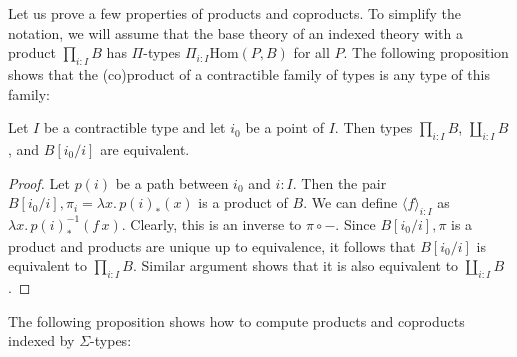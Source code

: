 \documentclass[reqno]{mscs}
\newcommand{\fs}[1]{\mathrm{#1}}
\newcommand{\Hom}{\fs{Hom}}
\newcommand{\sym}[1]{#1^{-1}}
\numberwithin{figure}{section}
\begin{document}
Let us prove a few properties of products and coproducts.
To simplify the notation, we will assume that the base theory of an indexed theory with a product $\prod_{i : I} B$ has $\Pi$-types $\Pi_{i : I} \Hom(P,B)$ for all $P$.
The following proposition shows that the (co)product of a contractible family of types is any type of this family:

\begin{prop}
Let $I$ be a contractible type and let $i_0$ be a point of $I$.
Then types $\prod_{i : I} B$, $\coprod_{i : I} B$, and $B[i_0/i]$ are equivalent.
\end{prop}
\begin{proof}
Let $p(i)$ be a path between $i_0$ and $i : I$.
Then the pair $B[i_0/i], \pi_i = \lambda x.\,p(i)_*(x)$ is a product of $B$.
We can define $\langle f \rangle_{i : I}$ as $\lambda x.\,\sym{p(i)}_*(f\,x)$.
Clearly, this is an inverse to $\pi \circ -$.
Since $B[i_0/i],\pi$ is a product and products are unique up to equivalence, it follows that $B[i_0/i]$ is equivalent to $\prod_{i : I} B$.
Similar argument shows that it is also equivalent to $\coprod_{i : I} B$.
\end{proof}

The following proposition shows how to compute products and coproducts indexed by $\Sigma$-types:
\end{document}
